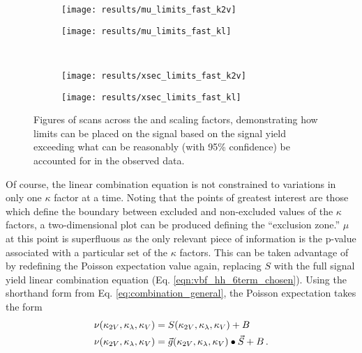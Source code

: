     \begin{figure}
        \centering
        \begin{subfigure}{0.48\textwidth} 
            \texttt{[image: results/mu\_limits\_fast\_k2v]}
            \caption{}%
            \label{fig:mulimits_kvv}
        \end{subfigure}
        \begin{subfigure}{0.48\textwidth}
            \texttt{[image: results/mu\_limits\_fast\_kl]}
            \caption{}%
            \label{fig:mulimits_kl}
        \end{subfigure}\\
        \begin{subfigure}{0.48\textwidth} 
            \texttt{[image: results/xsec\_limits\_fast\_k2v]}
            \caption{}%
            \label{fig:xseclimits_kvv}
        \end{subfigure}
        \begin{subfigure}{0.48\textwidth}
            \texttt{[image: results/xsec\_limits\_fast\_kl]}
            \caption{}%
            \label{fig:xseclimits_kl}
        \end{subfigure}
        \caption{
            Figures of scans across the \kvv and \kl scaling factors,
                demonstrating how limits can be placed on the signal based on
                the signal yield exceeding what can be reasonably (with 95\% confidence)
                be accounted for in the observed data.
        }
    \end{figure}

    Of course, the linear combination equation is not constrained to variations in only one $\kappa$ factor at a time.
    Noting that the points of greatest interest are those which define the boundary between excluded and non-excluded
        values of the $\kappa$ factors, a two-dimensional plot can be produced defining the ``exclusion zone.''
    $\mu$ at this point is superfluous as the only relevant piece of information is the p-value
        associated with a particular set of the $\kappa$ factors.
    This can be taken advantage of by redefining the Poisson expectation value again,
        replacing $S$ with the full signal yield linear combination equation (Eq. \ref{eqn:vbf_hh_6term_chosen}).
    Using the shorthand form from Eq. \ref{eq:combination_general}, the Poisson expectation takes the form
    \begin{equation} \begin{split}
        \nu(\kappa_{2V},\kappa_{\lambda},\kappa_{V}) &= S(\kappa_{2V},\kappa_{\lambda},\kappa_{V}) + B \\
        \nu(\kappa_{2V},\kappa_{\lambda},\kappa_{V}) &= \vec{g}(\kappa_{2V},\kappa_{\lambda},\kappa_{V}) \bullet \vec{S} + B
        \,.
    \end{split} \end{equation}

